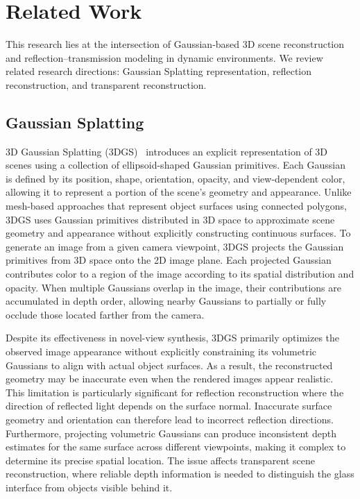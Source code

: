 \chapter{Related Work}

This research lies at the intersection of Gaussian-based 3D scene reconstruction and reflection--transmission modeling in dynamic environments. We review related research directions: Gaussian Splatting representation, reflection reconstruction, and transparent reconstruction.

\section{Gaussian Splatting}

3D Gaussian Splatting (3DGS)~\cite{kerbl2023} introduces an explicit representation of 3D scenes using a collection of ellipsoid-shaped Gaussian primitives. Each Gaussian is defined by its position, shape, orientation, opacity, and view-dependent color, allowing it to represent a portion of the scene's geometry and appearance. Unlike mesh-based approaches that represent object surfaces using connected polygons, 3DGS uses Gaussian primitives distributed in 3D space to approximate scene geometry and appearance without explicitly constructing continuous surfaces. To generate an image from a given camera viewpoint, 3DGS projects the Gaussian primitives from 3D space onto the 2D image plane. Each projected Gaussian contributes color to a region of the image according to its spatial distribution and opacity. When multiple Gaussians overlap in the image, their contributions are accumulated in depth order, allowing nearby Gaussians to partially or fully occlude those located farther from the camera.

Despite its effectiveness in novel-view synthesis, 3DGS primarily optimizes the observed image appearance without explicitly constraining its volumetric Gaussians to align with actual object surfaces. As a result, the reconstructed geometry may be inaccurate even when the rendered images appear realistic. This limitation is particularly significant for reflection reconstruction where the direction of reflected light depends on the surface normal. Inaccurate surface geometry and orientation can therefore lead to incorrect reflection directions. Furthermore, projecting volumetric Gaussians can produce inconsistent depth estimates for the same surface across different viewpoints, making it complex to determine its precise spatial location. The issue affects transparent scene reconstruction, where reliable depth information is needed to distinguish the glass interface from objects visible behind it.

